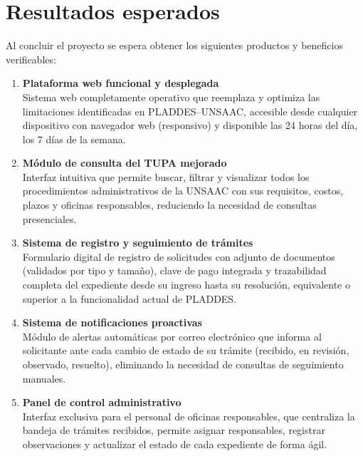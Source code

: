 \section{Resultados esperados}

Al concluir el proyecto se espera obtener los siguientes productos y beneficios
verificables:

\begin{enumerate}[label=\textbf{\arabic*.}]

  \item \textbf{Plataforma web funcional y desplegada}\\
    Sistema web completamente operativo que reemplaza y optimiza las limitaciones
    identificadas en PLADDES--UNSAAC, accesible desde cualquier dispositivo con
    navegador web (responsivo) y disponible las 24 horas del día, los 7 días de
    la semana.

  \item \textbf{Módulo de consulta del TUPA mejorado}\\
    Interfaz intuitiva que permite buscar, filtrar y visualizar todos los
    procedimientos administrativos de la UNSAAC con sus requisitos, costos,
    plazos y oficinas responsables, reduciendo la necesidad de consultas
    presenciales.

  \item \textbf{Sistema de registro y seguimiento de trámites}\\
    Formulario digital de registro de solicitudes con adjunto de documentos
    (validados por tipo y tamaño), clave de pago integrada y trazabilidad
    completa del expediente desde su ingreso hasta su resolución, equivalente
    o superior a la funcionalidad actual de PLADDES.

  \item \textbf{Sistema de notificaciones proactivas}\\
    Módulo de alertas automáticas por correo electrónico que informa al
    solicitante ante cada cambio de estado de su trámite (recibido, en revisión,
    observado, resuelto), eliminando la necesidad de consultas de seguimiento
    manuales.

  \item \textbf{Panel de control administrativo}\\
    Interfaz exclusiva para el personal de oficinas responsables, que centraliza
    la bandeja de trámites recibidos, permite asignar responsables, registrar
    observaciones y actualizar el estado de cada expediente de forma ágil.


\end{enumerate}
